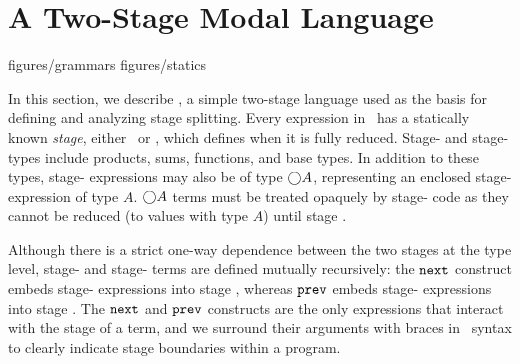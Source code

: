 \section{A Two-Stage Modal Language}

 {figures/grammars}
 {figures/statics}

In this section, we describe \lang, a simple two-stage language
used as the basis for defining and analyzing stage splitting.
Every expression in \lang\ has a statically known {\em stage},
either \bbone~or \bbtwo, which defines when it is fully reduced.
%
Stage-\bbone{} and stage-\bbtwo{} types include products, sums, functions, and base types.
In addition to these types, stage-\bbone{} expressions may also be of type $\bigcirc A$,
representing an enclosed stage-\bbtwo{} expression of type $A$.
$\bigcirc A$ terms must be treated opaquely by stage-\bbone{} code
as they cannot be reduced (to values with type $A$) until stage \bbtwo. 

Although there is a strict one-way dependence between the two stages at the type
level, stage-\bbone{} and stage-\bbtwo{} terms are defined mutually recursively:
the ${\tt next}$ construct embeds stage-\bbtwo{} expressions into stage \bbone,
whereas ${\tt prev}$ embeds stage-\bbone{} expressions into stage \bbtwo.
The ${\tt next}$ and ${\tt prev}$ constructs are the only expressions that interact with the stage of a term,
and we surround their arguments with braces in \lang\ syntax to clearly indicate stage boundaries within a program.

